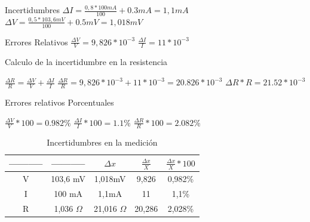 \documentclass[12pt, letterpaper]{article}
\begin{document}
\item  Incertidumbres\singlespacing
$\Delta I= \frac{0,8 * 100mA}{100}+0.3mA=1,1mA$\singlespacing
$\Delta V= \frac{0,5 * 103,6mV}{100}+0.5mV=1,018mV$\singlespacing
\item Errores Relativos\singlespacing
$\frac{\Delta V}{V}=9,826*10^{-3}$\singlespacing
$\frac{\Delta I}{I}=11*10^{-3}$ \singlespacing
\item Calculo de la incertidumbre en la resistencia\singlespacing

$\frac{\Delta R}{R} =\frac{\Delta V}{V} + \frac{\Delta I}{I}$ \singlespacing
$\frac{\Delta R}{R}=9,826*10^{-3}+11*10^{-3}=20.826*10^{-3}$
$\Delta R * R=21.52*10^{-3}$\singlespacing

\item Errores relativos Porcentuales\singlespacing

$\frac{\Delta V}{V} * 100=0.982\%$\singlespacing
$\frac{\Delta I}{I} * 100=1.1\%$\singlespacing
$\frac{\Delta R}{R} * 100=2.082\%$\singlespacing
 
\begin{table}[H]
\centering
\caption{Incertidumbres en la medición}
	\begin{tabular}{|c|c|c|c|c|}
    	\hline
    	----------- & ----------- & $\Delta x$  & $\frac{\Delta x}{X}$  & $\frac{\Delta x}{X} *100$ \\ \hline
    	V           & 103,6 mV    & 1,018mV & 9,826      & 0,982\%        \\ \hline
    	I           & 100 mA      & 1,1mA   & 11         & 1,1\%          \\ \hline
    	R           & 1,036    $\Omega$    & 21,016 $\Omega$  & 20,286     & 2,028\%        \\ \hline
	\end{tabular}
 \label{tab\insertidumbres}
\end{table}

\singlespacing
\end{document}
